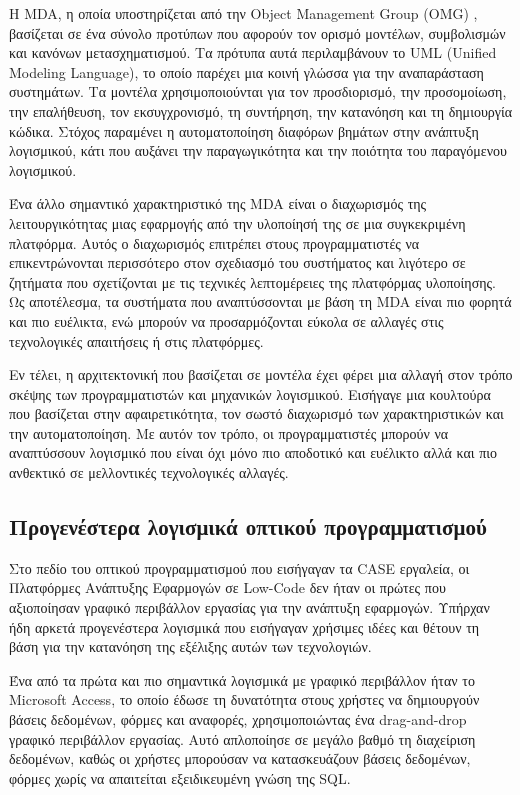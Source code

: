             Η MDA, η οποία υποστηρίζεται από την Object Management Group (OMG) \cite{OMG_MDA}, βασίζεται σε ένα σύνολο προτύπων που αφορούν τον ορισμό μοντέλων, συμβολισμών και κανόνων μετασχηματισμού. Τα πρότυπα αυτά περιλαμβάνουν το UML (Unified Modeling Language), το οποίο παρέχει μια κοινή γλώσσα για την αναπαράσταση συστημάτων. Τα μοντέλα χρησιμοποιούνται για τον προσδιορισμό, την προσομοίωση, την επαλήθευση, τον εκσυγχρονισμό, τη συντήρηση, την κατανόηση και τη δημιουργία κώδικα. Στόχος παραμένει η αυτοματοποίηση διαφόρων βημάτων στην ανάπτυξη λογισμικού, κάτι που αυξάνει την παραγωγικότητα και την ποιότητα του παραγόμενου λογισμικού.

            Ένα άλλο σημαντικό χαρακτηριστικό της MDA είναι ο διαχωρισμός της λειτουργικότητας μιας εφαρμογής από την υλοποίησή της σε μια συγκεκριμένη πλατφόρμα. Αυτός ο διαχωρισμός επιτρέπει στους προγραμματιστές να επικεντρώνονται περισσότερο στον σχεδιασμό του συστήματος και λιγότερο σε ζητήματα που σχετίζονται με τις τεχνικές λεπτομέρειες της πλατφόρμας υλοποίησης. Ως αποτέλεσμα, τα συστήματα που αναπτύσσονται με βάση τη MDA είναι πιο φορητά και πιο ευέλικτα, ενώ μπορούν να προσαρμόζονται εύκολα σε αλλαγές στις τεχνολογικές απαιτήσεις ή στις πλατφόρμες. \cite{Bucaioni2022, MDELow, MDSDSpringer}

            Εν τέλει, η αρχιτεκτονική που βασίζεται σε μοντέλα έχει φέρει μια αλλαγή στον τρόπο σκέψης των προγραμματιστών και μηχανικών λογισμικού. Εισήγαγε μια κουλτούρα που βασίζεται στην αφαιρετικότητα, τον σωστό διαχωρισμό των χαρακτηριστικών και την αυτοματοποίηση. Με αυτόν τον τρόπο, οι προγραμματιστές μπορούν να αναπτύσσουν λογισμικό που είναι όχι μόνο πιο αποδοτικό και ευέλικτο αλλά και πιο ανθεκτικό σε μελλοντικές τεχνολογικές αλλαγές.

        \subsection{Προγενέστερα λογισμικά οπτικού προγραμματισμού}
            Στο πεδίο του οπτικού προγραμματισμού που εισήγαγαν τα CASE εργαλεία, οι Πλατφόρμες Ανάπτυξης Εφαρμογών σε Low-Code δεν ήταν οι πρώτες που αξιοποίησαν γραφικό περιβάλλον εργασίας για την ανάπτυξη εφαρμογών. Υπήρχαν ήδη αρκετά προγενέστερα λογισμικά που εισήγαγαν χρήσιμες ιδέες και θέτουν τη βάση για την κατανόηση της εξέλιξης αυτών των τεχνολογιών.

            Ένα από τα πρώτα και πιο σημαντικά λογισμικά με γραφικό περιβάλλον ήταν το Microsoft Access, το οποίο έδωσε τη δυνατότητα στους χρήστες να δημιουργούν βάσεις δεδομένων, φόρμες και αναφορές, χρησιμοποιώντας ένα drag-and-drop γραφικό περιβάλλον εργασίας. Αυτό απλοποίησε σε μεγάλο βαθμό τη διαχείριση δεδομένων, καθώς οι χρήστες  μπορούσαν να κατασκευάζουν βάσεις δεδομένων, φόρμες χωρίς να απαιτείται εξειδικευμένη γνώση της SQL.

